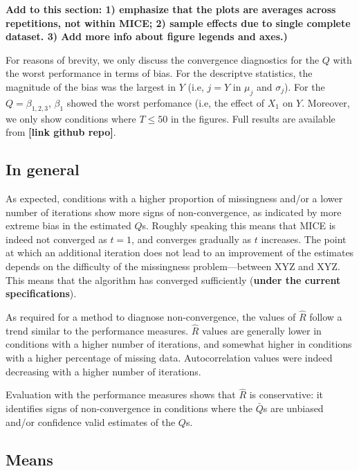 \documentclass[Royal,times,sageh]{sagej}
\begin{document}
\textbf{Add to this section: 1) emphasize that the plots are averages
across repetitions, not within MICE; 2) sample effects due to single
complete dataset. 3) Add more info about figure legends and axes.)}

For reasons of brevity, we only discuss the convergence diagnostics for
the \(Q\) with the worst performance in terms of bias. For the
descriptve statistics, the magnitude of the bias was the largest in
\(Y\) (i.e, \(j = Y\) in \(\mu_j\) and \(\sigma_j\)). For the
\(Q=\beta_{1,2,3}\), \(\beta_1\) showed the worst perfomance (i.e, the
effect of \(X_1\) on \(Y\). Moreover, we only show conditions where
\(T\leq50\) in the figures. Full results are available from
\textbf{{[}link github repo{]}}.

\hypertarget{in-general}{%
\subsection{In general}\label{in-general}}

As expected, conditions with a higher proportion of missingness and/or a
lower number of iterations show more signs of non-convergence, as
indicated by more extreme bias in the estimated \(Q\)s. Roughly speaking
this means that MICE is indeed not converged as \(t=1\), and converges
gradually as \(t\) increases. The point at which an additional iteration
does not lead to an improvement of the estimates depends on the
difficulty of the missingness problem---between XYZ and XYZ. This means
that the algorithm has converged sufficiently (\textbf{under the current
specifications}).

As required for a method to diagnose non-convergence, the values of
\(\widehat{R}\) follow a trend similar to the performance measures.
\(\widehat{R}\) values are generally lower in conditions with a higher
number of iterations, and somewhat higher in conditions with a higher
percentage of missing data. Autocorrelation values were indeed
decreasing with a higher number of iterations.

Evaluation with the performance measures shows that \(\widehat{R}\) is
conservative: it identifies signs of non-convergence in conditions where
the \(\bar{Q}\)s are unbiased and/or confidence valid estimates of the
\(Q\)s.

\hypertarget{means}{%
\subsection{Means}\label{means}}
\end{document}
